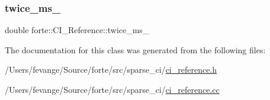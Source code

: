 \mbox{\label{classforte_1_1_c_i___reference_a4a545fae5773bd93e5fb55bdd95303a9}} 
\subsubsection{\texorpdfstring{twice\+\_\+ms\+\_\+}{twice\_ms\_}}
{\footnotesize\ttfamily double forte\+::\+C\+I\+\_\+\+Reference\+::twice\+\_\+ms\+\_\+\hspace{0.3cm}{\ttfamily [protected]}}



The documentation for this class was generated from the following files\+:\begin{DoxyCompactItemize}
\item 
/\+Users/fevange/\+Source/forte/src/sparse\+\_\+ci/\mbox{\hyperlink{ci__reference_8h}{ci\+\_\+reference.\+h}}\item 
/\+Users/fevange/\+Source/forte/src/sparse\+\_\+ci/\mbox{\hyperlink{ci__reference_8cc}{ci\+\_\+reference.\+cc}}\end{DoxyCompactItemize}
